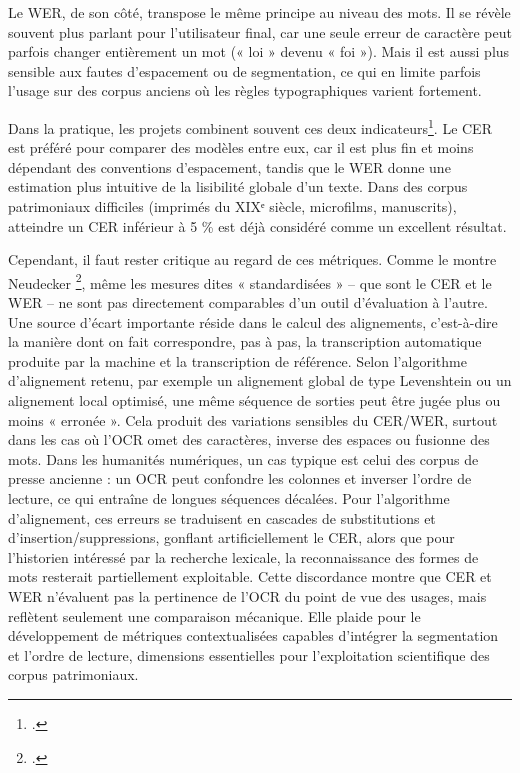 Le WER, de son côté, transpose le même principe au niveau des mots. Il se révèle souvent plus parlant pour l’utilisateur final, car une seule erreur de caractère peut parfois changer entièrement un mot (« loi » devenu « foi »). Mais il est aussi plus sensible aux fautes d’espacement ou de segmentation, ce qui en limite parfois l’usage sur des corpus anciens où les règles typographiques varient fortement.

Dans la pratique, les projets combinent souvent ces deux indicateurs\footcite[][]{fleischhacker}. Le CER est préféré pour comparer des modèles entre eux, car il est plus fin et moins dépendant des conventions d’espacement, tandis que le WER donne une estimation plus intuitive de la lisibilité globale d’un texte. Dans des corpus patrimoniaux difficiles (imprimés du XIXᵉ siècle, microfilms, manuscrits), atteindre un CER inférieur à 5 \% est déjà considéré comme un excellent résultat.

Cependant, il faut rester critique au regard de ces métriques. Comme le montre Neudecker \footcite[][]{neudecker}, même les mesures dites « standardisées »  -- que sont le CER et le WER -- ne sont pas directement comparables d’un outil d’évaluation à l’autre. Une source d’écart importante réside dans le calcul des alignements, c’est-à-dire la manière dont on fait correspondre, pas à pas, la transcription automatique produite par la machine et la transcription de référence. Selon l’algorithme d’alignement retenu, par exemple un alignement global de type Levenshtein ou un alignement local optimisé, une même séquence de sorties peut être jugée plus ou moins « erronée ». Cela produit des variations sensibles du CER/WER, surtout dans les cas où l’OCR omet des caractères, inverse des espaces ou fusionne des mots. Dans les humanités numériques, un cas typique est celui des corpus de presse ancienne : un OCR peut confondre les colonnes et inverser l’ordre de lecture, ce qui entraîne de longues séquences décalées. Pour l’algorithme d’alignement, ces erreurs se traduisent en cascades de substitutions et d’insertion/suppressions, gonflant artificiellement le CER, alors que pour l’historien intéressé par la recherche lexicale, la reconnaissance des formes de mots resterait partiellement exploitable. Cette discordance montre que CER et WER n’évaluent pas la pertinence de l’OCR du point de vue des usages, mais reflètent seulement une comparaison mécanique. Elle plaide pour le développement de métriques contextualisées capables d’intégrer la segmentation et l’ordre de lecture, dimensions essentielles pour l’exploitation scientifique des corpus patrimoniaux.

